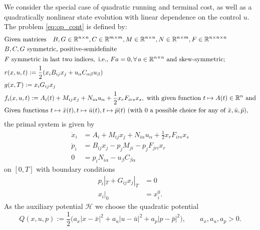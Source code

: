 \documentclass[11pt]{article}
\newcommand{\R}{\mathbb R}
\newcommand{\half}{\frac{1}{2}}
\begin{document}
We consider the special case of quadratic running and terminal cost, as well as a quadratically nonlinear state evolution with linear dependence on the control $u$. The problem \eqref{eq:op_cont} is defined by:
\begin{subequations}
\allowdisplaybreaks
\label{eq:QQR_def}
\begin{align}
& \mbox{Given matrices} \quad B, G \in \R^{n \times n},  C \in \R^{m \times m}, M \in \R^{n \times n}, N \in \R^{n \times m}, F \in \R^{n \times n \times n} \notag\\
& B,C,G \ \mbox{symmetric, positive-semidefinite} \notag\\
& F \ \mbox{symmetric in last two indices}, \mbox{ i.e., } F a = 0, \forall \, a \in \R^{n \times n} \ \mbox{and skew-symmetric;} \notag\\
    & r(x,u,t) := \half (x_i B_{ij} x_j + u_\alpha C_{\alpha \beta} u_\beta) \notag\\
    & g(x,T) := x_iG_{ij} x_j \notag\\
    & f_i(x,u,t) := A_i(t) + M_{ij} x_j + N_{i\alpha} u_\alpha + \half x_r F_{irs} x_s, \mbox{ with given function } t \mapsto A(t)  \in \R^n \mbox{ and} \notag\\
    & \mbox{Given functions} \ t\mapsto \bar{x}(t), t \mapsto \bar{u}(t), t\mapsto \bar{p}(t) \mbox{ (with 0 a possible choice for any of } \bar{x}, \bar{u}, \bar{p}), \notag
\end{align}
\end{subequations}
the primal system is given by
\begin{equation}
    \label{eq:primal_QQR}
    \begin{aligned}
        \dot{x}_i & = A_i + M_{ij} x_j + N_{i\alpha} u_\alpha + \half x_r F_{irs} x_s \\
        \dot{p}_i & = B_{ij} x_j - p_j  M_{ji} - p_j F_{jri} x_r\\
        0 & = p_i N_{i \alpha} - u_\beta C_{\beta \alpha} 
    \end{aligned}
\end{equation}
on $[0,T]$ with boundary conditions
\begin{equation}
    \label{eq:primal_QQR_bc}
    \begin{aligned}
         p_i|_T + G_{ij} x_j|_T & = 0\\
    x_i|_0 & = x^0_i.
    \end{aligned}
\end{equation}
As the auxiliary potential $\mathcal{H}$ we choose the quadratic potential
\[
Q(x,u,p) := \half \Big( a_x |x - \bar{x}|^2 + a_u |u - \bar{u}|^2 + a_p |p - \bar{p}|^2 \Big), \qquad a_x, a_u, a_p > 0.
\]
\end{document}
